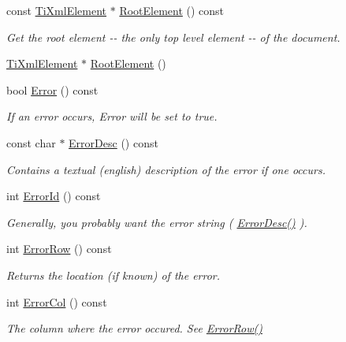 \begin{DoxyCompactItemize}
const \hyperlink{classTiXmlElement}{TiXmlElement} $\ast$ \hyperlink{classTiXmlDocument_ad09d17927f908f40efb406af2fb873be}{RootElement} () const 
\begin{DoxyCompactList}\small\item\em Get the root element -\/-\/ the only top level element -\/-\/ of the document. \item\end{DoxyCompactList}\item 
\hyperlink{classTiXmlElement}{TiXmlElement} $\ast$ \hyperlink{classTiXmlDocument_a0b43e762a23f938b06651bc90b8a1013}{RootElement} ()
\item 
bool \hyperlink{classTiXmlDocument_a6dfc01a6e5d58e56acd537dfd3bdeb29}{Error} () const 
\begin{DoxyCompactList}\small\item\em If an error occurs, Error will be set to true. \item\end{DoxyCompactList}\item 
const char $\ast$ \hyperlink{classTiXmlDocument_a9d0f689f6e09ea494ea547be8d79c25e}{ErrorDesc} () const 
\begin{DoxyCompactList}\small\item\em Contains a textual (english) description of the error if one occurs. \item\end{DoxyCompactList}\item 
int \hyperlink{classTiXmlDocument_af96fc2f3f9ec6422782bfe916c9e778f}{ErrorId} () const 
\begin{DoxyCompactList}\small\item\em Generally, you probably want the error string ( \hyperlink{classTiXmlDocument_a9d0f689f6e09ea494ea547be8d79c25e}{ErrorDesc()} ). \item\end{DoxyCompactList}\item 
int \hyperlink{classTiXmlDocument_af30efc75e804aa2e92fb8be3a8cb676e}{ErrorRow} () const 
\begin{DoxyCompactList}\small\item\em Returns the location (if known) of the error. \item\end{DoxyCompactList}\item 
int \hyperlink{classTiXmlDocument_aa90bc630ee5203c6109ca5fad3323649}{ErrorCol} () const 
\begin{DoxyCompactList}\small\item\em The column where the error occured. See \hyperlink{classTiXmlDocument_af30efc75e804aa2e92fb8be3a8cb676e}{ErrorRow()} \item\end{DoxyCompactList}\item 

\end{DoxyCompactItemize}

